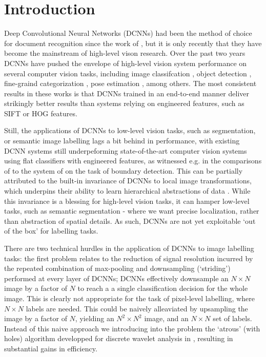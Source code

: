 \section{Introduction}
\label{sec:intro}
Deep Convolutional Neural Networks (DCNNs) had been the method of choice for document recognition since the work of \citet{LeCun1998}, but 
it is only recently that they have become the mainstream of high-level vison research.
Over the past two years  DCNNs have pushed the envelope of high-level vision system performance on several computer vision tasks, including image classifcation \citet{KrizhevskyNIPS2013, papandreou2014untangling, sermanet2013overfeat, simonyan2014very, szegedy2014going}, object detection \citet{girshick2014rcnn}, fine-graind categorization \citet{zhang2014part}, pose estimation \citet{chen2014articulated, tompson2014joint}, among others.
The most consistent results in these works is that DCNNs trained in an end-to-end manner  deliver  strikingly better results than systems relying on engineered features, such as SIFT or HOG features.

Still, the applications of DCNNs to low-level vision tasks, such as segmentation, or semantic image labelling  lags a bit behind in performance, with existing DCNN systems still underpeforming  state-of-the-art  computer vision systems using flat classifiers with engineered features, as witnessed e.g. in the comparisons of \cite{williams14} to the system of \cite{DollarZ13} on the task of boundary detection. 
 This can be partially attributed to the built-in  invariance of DCNNs to local image transformations, which underpins their ability to learn hierarchical abstractions of data \citep{zeiler2014visualizing}.
While this invariance is a blessing for high-level vision tasks, it can hamper low-level tasks, such as semantic segmentation - where we want precise localization, rather than abstraction of spatial details.  As such, DCNNs are not yet exploitable `out of the box' for labelling tasks. 

There are two technical hurdles in the application of DCNNs to image labelling tasks: the first problem relates to the reduction of signal resolution incurred by the repeated combination of max-pooling and downsampling (`striding') performed at every layer of DCNNs; DCNNs effectively downsample an $N\times N$ image by a factor of $N$ to reach a 
a single  classification decision for the whole image. This is clearly not appropriate for the task of pixel-level labelling, where $N \times N$ labels are needed. This could  be naively alleaviated by upsampling the image by a factor of $N$, yielding an $N^2\times N^2$ image, and an $N\times N$ set of labels. Instead of this naive approach we introducing into the problem the `atrous' (with holes) algorithm developped for  discrete wavelet analysis in \cite{}, resulting in substantial gains in efficiency. 


